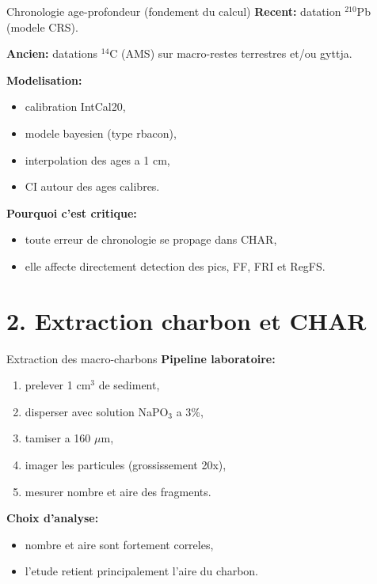 \documentclass[aspectratio=169,11pt]{beamer}
\begin{document}
\begin{frame}{Chronologie age-profondeur (fondement du calcul)}
\textbf{Recent:} datation \(^{210}\)Pb (modele CRS).

\textbf{Ancien:} datations \(^{14}\)C (AMS) sur macro-restes terrestres et/ou gyttja.

\textbf{Modelisation:}
\begin{itemize}
  \item calibration IntCal20,
  \item modele bayesien (type rbacon),
  \item interpolation des ages a 1 cm,
  \item CI autour des ages calibres.
\end{itemize}

\textbf{Pourquoi c'est critique:}
\begin{itemize}
  \item toute erreur de chronologie se propage dans CHAR,
  \item elle affecte directement detection des pics, FF, FRI et RegFS.
\end{itemize}
\end{frame}

\section{2. Extraction charbon et CHAR}

\begin{frame}{Extraction des macro-charbons}
\textbf{Pipeline laboratoire:}
\begin{enumerate}
  \item prelever 1 cm$^3$ de sediment,
  \item disperser avec solution NaPO\(_3\) a 3\%,
  \item tamiser a \alert{160 \(\mu\)m},
  \item imager les particules (grossissement 20x),
  \item mesurer nombre et aire des fragments.
\end{enumerate}

\textbf{Choix d'analyse:}
\begin{itemize}
  \item nombre et aire sont fortement correles,
  \item l'etude retient principalement \alert{l'aire du charbon}.
\end{itemize}
\end{frame}
\end{document}
